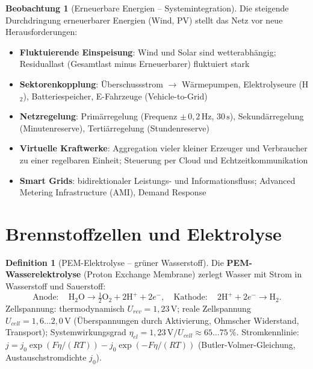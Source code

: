 ﻿\documentclass[a4paper,12pt]{report}
\theoremstyle{definition}
\newtheorem{definition}{Definition}
\newtheorem{beobachtung}{Beobachtung}
\begin{document}
\begin{beobachtung}[Erneuerbare Energien -- Systemintegration]
Die steigende Durchdringung erneuerbarer Energien (Wind, PV) stellt
das Netz vor neue Herausforderungen:
\begin{itemize}
    \item[-] \textbf{Fluktuierende Einspeisung}: Wind und Solar sind wetterabhängig;
          Residuallast (Gesamtlast minus Erneuerbarer) fluktuiert stark
    \item[-] \textbf{Sektorenkopplung}: Überschussstrom $\to$ Wärmepumpen,
          Elektrolyseure (H$_2$), Batteriespeicher, E-Fahrzeuge (Vehicle-to-Grid)
    \item[-] \textbf{Netzregelung}: Primärregelung (Frequenz $\pm\,0{,}2\,\mathrm{Hz}$,
          $30\,\mathrm{s}$), Sekundärregelung (Minutenreserve), Tertiärregelung (Stundenreserve)
    \item[-] \textbf{Virtuelle Kraftwerke}: Aggregation vieler kleiner Erzeuger
          und Verbraucher zu einer regelbaren Einheit;
          Steuerung per Cloud und Echtzeitkommunikation
    \item[-] \textbf{Smart Grids}: bidirektionaler Leistungs- und Informationsfluss;
          Advanced Metering Infrastructure (AMI), Demand Response
\end{itemize}
\end{beobachtung}

\section{Brennstoffzellen und Elektrolyse}

\begin{definition}[PEM-Elektrolyse -- grüner Wasserstoff]
Die \textbf{PEM-Wasserelektrolyse} (Proton Exchange Membrane) zerlegt
Wasser mit Strom in Wasserstoff und Sauerstoff:
\[
  \mathrm{Anode:}\quad \mathrm{H_2O} \to \tfrac{1}{2}\mathrm{O_2} + 2\mathrm{H^+} + 2e^-, \quad
  \mathrm{Kathode:}\quad 2\mathrm{H^+} + 2e^- \to \mathrm{H_2}.
\]
Zellspannung: thermodynamisch $U_{rev} = 1{,}23\,\mathrm{V}$;
reale Zellspannung $U_{cell} = 1{,}6\ldots2{,}0\,\mathrm{V}$
(Überspannungen durch Aktivierung, Ohmscher Widerstand, Transport);
Systemwirkungsgrad $\eta_{el} = 1{,}23\,\mathrm{V}/U_{cell} \approx 65\ldots75\,\%$.
Stromkennlinie: $j = j_0\exp(F\eta/(RT)) - j_0\exp(-F\eta/(RT))$
(Butler-Volmer-Gleichung, Austauschstromdichte $j_0$).
\end{definition}
\end{document}
